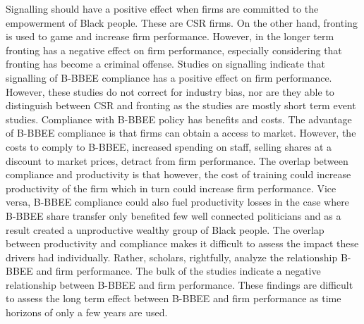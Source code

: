 Signalling should have a positive effect when firms are committed to the empowerment of Black people. These are CSR firms. On the other hand, fronting is used to game and increase firm performance. However, in the longer term fronting has a negative effect on firm performance, especially considering that fronting has become a criminal offense. Studies on signalling indicate that signalling of B-BBEE compliance has a positive effect on firm performance. However, these studies do not correct for industry bias, nor are they able to distinguish between CSR and fronting as the studies are mostly short term event studies. Compliance with B-BBEE policy has benefits and costs. The advantage of B-BBEE compliance is that firms can obtain a access to market. However, the costs to comply to B-BBEE, increased spending on staff, selling shares at a discount to market prices, detract from firm performance. The overlap between compliance and productivity is that however, the cost of training could increase productivity of the firm which in turn could increase firm performance. Vice versa, B-BBEE compliance could also fuel productivity losses in the case where B-BBEE share transfer only benefited few well connected politicians and as a result created a unproductive wealthy group of Black people. The overlap between productivity and compliance makes it difficult to assess the impact these drivers had individually. Rather, scholars, rightfully, analyze the relationship B-BBEE and firm performance. The bulk of the studies indicate a negative relationship between B-BBEE and firm performance. These findings are difficult to assess the long term effect between B-BBEE and firm performance as time horizons of only a few years are used.